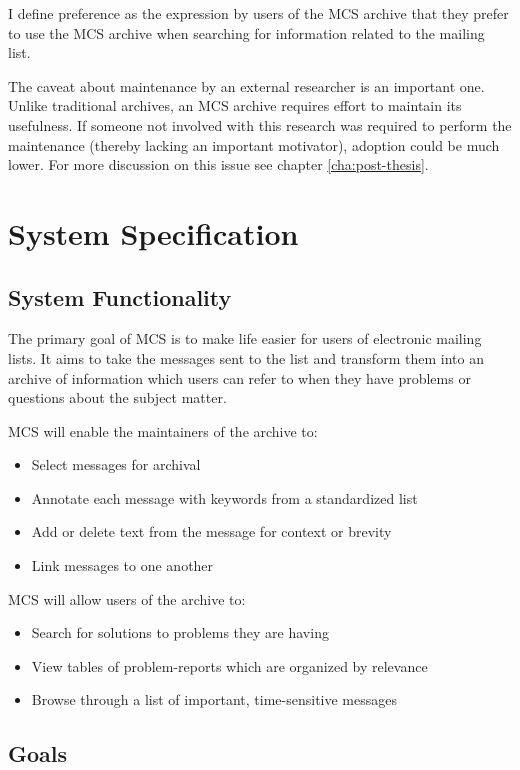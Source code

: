 I define preference as the expression by users of the MCS archive that they
prefer to use the MCS archive when searching for information related to the
mailing list.

The caveat about maintenance by an external researcher is an important one.
Unlike traditional archives, an MCS archive requires effort to maintain its
usefulness. If someone not involved with this research was required to perform
the maintenance (thereby lacking an important motivator), adoption could be
much lower. For more discussion on this issue see chapter
\ref{cha:post-thesis}.


\chapter{System Specification}

\section{System Functionality}
The primary goal of MCS is to make life easier for users of electronic mailing
lists. It aims to take the messages sent to the list and transform them into an
archive of information which users can refer to when they have problems or
questions about the subject matter.

MCS will enable the maintainers of the archive to:
\begin{itemize}
\item Select messages for archival
\item Annotate each message with keywords from a standardized list
\item Add or delete text from the message for context or brevity
\item Link messages to one another
\end{itemize}

MCS will allow users of the archive to:
\begin{itemize}
\item Search for solutions to problems they are having
\item View tables of problem-reports which are organized by relevance
\item Browse through a list of important, time-sensitive messages
\end{itemize}

\section{Goals}

